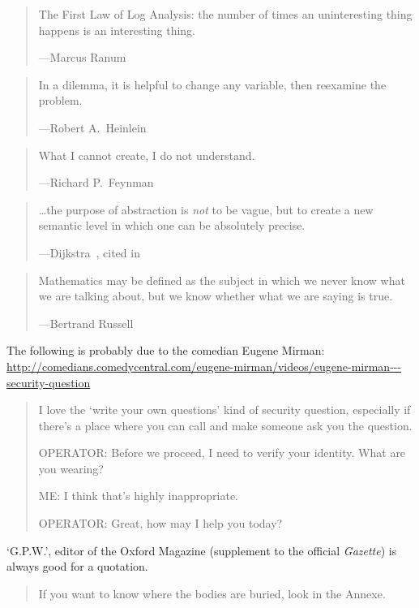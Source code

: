 \documentclass[a4paper]{article}
\begin{document}
\medskip
\begin{quote}
	The First Law of Log Analysis: the number of times an uninteresting
	thing happens is an interesting thing.

	---Marcus Ranum
\end{quote}

\medskip
\begin{quote}
	In a dilemma, it is helpful to change any variable, then reexamine
	the problem.

	---Robert A.~Heinlein
\end{quote}

\medskip
\begin{quote}
	What I cannot create, I do not understand.

	---Richard P.~Feynman
\end{quote}

\medskip
\begin{quote}
	\ldots the purpose of abstraction is \emph{not} to be vague, but
	to create a new semantic level in which one can be absolutely
	precise.

	---Dijkstra~\citet{Dijkstra1972a}, cited in~\citet{Henney2001a}
\end{quote}

\medskip
\begin{quote}
	Mathematics may be defined as the subject in which we never
	know what we are talking about, but we know whether what we
	are saying is true.

	---Bertrand Russell
\end{quote}

\medskip
The following is probably due to the comedian Eugene Mirman:
\url{http://comedians.comedycentral.com/eugene-mirman/videos/eugene-mirman---security-question}

\begin{quote}
	I love the `write your own questions' kind of security
	question, especially if there's a place where you can call
	and make someone ask you the question.

	OPERATOR: Before we proceed, I need to verify your identity. What are you wearing?

	ME: I think that's highly inappropriate.

	OPERATOR: Great, how may I help you today?~\citep{Thawtf2008a}
\end{quote}

\medskip
`G.P.W.', editor of the Oxford Magazine (supplement to
the official \emph{Gazette}) is always good for a quotation.
\begin{quote}
	If you want to know where the bodies are buried, look in
	the Annexe.~\citep{Williams2009a}
\end{quote}
\end{document}
